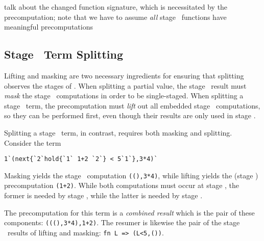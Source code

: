 \TODO talk about the changed function signature, which is necessitated by the precomputation;
note that we have to assume {\em all} stage \bbone\ functions have meaningful precomputations




\subsection{Stage \bbone\ Term Splitting}

Lifting and masking are two necessary ingredients for ensuring that splitting
observes the stages of \lang. When splitting a partial value, the stage \bbone\
result must \emph{mask} the stage \bbtwo\ computations in order to be
single-staged. When splitting a stage \bbtwo\ term, the precomputation must
\emph{lift} out all embedded stage \bbone\ computations, so they can be
performed first, even though their results are only used in stage \bbtwo.

Splitting a stage \bbone\ term, in contrast, requires both masking and splitting.
Consider the term 
\begin{lstlisting}
1`(next{`2`hold{`1` 1+2 `2`} < 5`1`},3*4)`
\end{lstlisting}
Masking yields the stage \bbone\ computation \verb|((),3*4)|, while lifting
yields the (stage \bbone) precomputation \verb|(1+2)|. While both computations
must occur at stage \bbone, the former is needed by stage \bbone, while the
latter is needed by stage \bbtwo.

The precomputation for this term is a \emph{combined result} which is
the pair of these components: \verb|(((),3*4),1+2)|. The resumer is
likewise the pair of the stage \bbtwo\ results of lifting and masking:
\verb|fn L => (L<5,())|.

